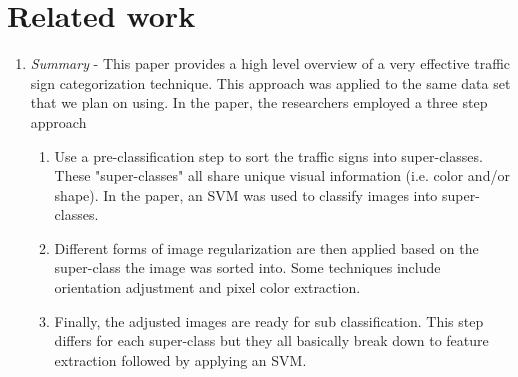 \documentclass{article} %
\begin{document}

\section{Related work}
\begin{enumerate}
    \item \citet{WangHierarchy}
    \emph{Summary} - This paper provides a high level overview of a very effective traffic sign categorization technique. This approach was applied to the same data set that we plan on using. In the paper, the researchers employed a three step approach
    \begin{enumerate}
        \item Use a pre-classification step to sort the traffic signs into super-classes. These "super-classes" all share unique visual information (i.e. color and/or shape). In the paper, an SVM was used to classify images into super-classes.
        \item Different forms of image regularization are then applied based on the super-class the image was sorted into. Some techniques include orientation adjustment and pixel color extraction.
        \item Finally, the adjusted images are ready for sub classification. This step differs for each super-class but they all basically break down to feature extraction followed by applying an SVM.
    \end{enumerate}


\end{enumerate}
\end{document}
